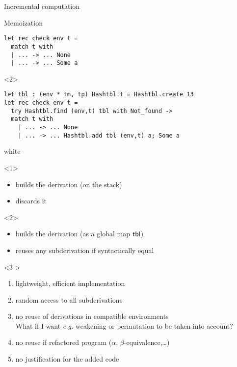 \documentclass{beamer}
\theoremstyle{example}
\begin{document}
\begin{frame}[fragile]{Incremental computation}
\begin{block}{Memoization}
\begin{overlayarea}{\textwidth}{.7\textheight}
\begin{onlyenv}
\begin{overlayarea}{\textwidth}{10em}
\begin{onlyenv}
\begin{lstlisting}
let rec check env t =
  match t with
  | ... -> ... None
  | ... -> ... Some a
          \end{lstlisting}
        \end{onlyenv}
        \begin{onlyenv}<2>
          \begin{lstlisting}
let tbl : (env * tm, tp) Hashtbl.t = Hashtbl.create 13
let rec check env t =
  try Hashtbl.find (env,t) tbl with Not_found ->
  match t with
    | ... -> ... None
    | ... -> ... Hashtbl.add tbl (env,t) a; Some a
          \end{lstlisting}
        \end{onlyenv}
      \end{overlayarea}
      \begin{overlayarea}{\textwidth}{3em}
        \begin{beamercolorbox}{white}
          \begin{onlyenv}<1>
            \begin{itemize}
            \item builds the derivation (on the stack)
            \item discards it
            \end{itemize}
          \end{onlyenv}
          \begin{onlyenv}<2>
            \begin{itemize}
            \item builds the derivation (as a global map ${\rm\mathsf{tbl}}$)
            \item reuses any subderivation if syntactically equal
            \end{itemize}
          \end{onlyenv}
        \end{beamercolorbox}
      \end{overlayarea}
    \end{onlyenv}

    \begin{onlyenv}<3->
      \begin{enumerate}
      \item[\itplus] lightweight, efficient implementation
      \item[\itplus] random access to all subderivations
      \item [\itminus] no reuse of derivations in compatible
        environments \\
        {\footnotesize What if I want \emph{e.g.} weakening or
          permutation to be taken into account?}
      \item[\itminus] no reuse if refactored program ($\alpha$,
        $\beta$-equivalence,\ldots)
      \item[\itminus] no justification for the added code
      \end{enumerate}


\end{onlyenv}
\end{overlayarea}
\end{block}
\end{frame}
\end{document}
